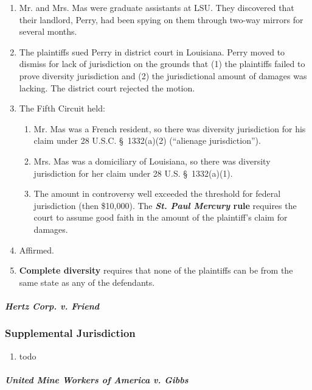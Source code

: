 \begin{enumerate}
    \item Mr. and Mrs. Mas were graduate assistants at LSU. They discovered that their landlord, Perry, had been spying on them through two-way mirrors for several months.
    \item The plaintiffs sued Perry in district court in Louisiana. Perry moved to dismiss for lack of jurisdiction on the grounds that (1) the plaintiffs failed to prove diversity jurisdiction and (2) the jurisdictional amount of damages was lacking. The district court rejected the motion.
    \item The Fifth Circuit held:
    \begin{enumerate}
        \item Mr. Mas was a French resident, so there was diversity jurisdiction for his claim under 28 U.S.C. \S\ 1332(a)(2) (``alienage jurisdiction'').
        \item Mrs. Mas was a domiciliary of Louisiana, so there was diversity jurisdiction for her claim under 28 U.S. \S\ 1332(a)(1).
        \item The amount in controversy well exceeded the threshold for federal jurisdiction (then \$10,000). The \textbf{\emph{St. Paul Mercury} rule} requires the court to assume good faith in the amount of the plaintiff's claim for damages.
    \end{enumerate}
    \item Affirmed.
    \item \textbf{Complete diversity} requires that none of the plaintiffs can be from the same state as any of the defendants.
\end{enumerate}

\paragraph{\emph{Hertz Corp. v. Friend}} %

\subsubsection{Supplemental Jurisdiction}

\begin{enumerate}
    \item todo
\end{enumerate}

\paragraph{\emph{United Mine Workers of America v. Gibbs}} %
